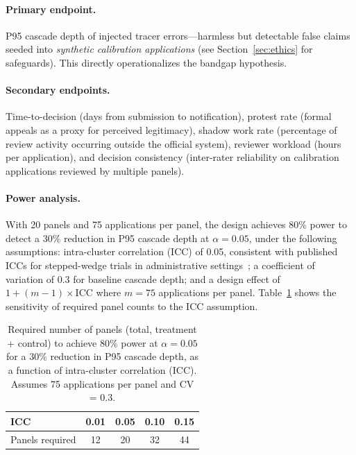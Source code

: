 \documentclass[runningheads]{llncs}
\begin{document}
\paragraph{Primary endpoint.}
P95 cascade depth of injected tracer errors---harmless but detectable false claims seeded into \emph{synthetic calibration applications} (see Section~\ref{sec:ethics} for safeguards). This directly operationalizes the bandgap hypothesis.

\paragraph{Secondary endpoints.}
Time-to-decision (days from submission to notification), protest rate (formal appeals as a proxy for perceived legitimacy), shadow work rate (percentage of review activity occurring outside the official system), reviewer workload (hours per application), and decision consistency (inter-rater reliability on calibration applications reviewed by multiple panels).

\paragraph{Power analysis.}
With 20 panels and 75 applications per panel, the design achieves 80\% power to detect a 30\% reduction in P95 cascade depth at $\alpha = 0.05$, under the following assumptions: intra-cluster correlation (ICC) of 0.05, consistent with published ICCs for stepped-wedge trials in administrative settings~\cite{hemming2015stepped}; a coefficient of variation of 0.3 for baseline cascade depth; and a design effect of $1 + (m-1) \times \mathrm{ICC}$ where $m = 75$ applications per panel. Table~\ref{tab:icc} shows the sensitivity of required panel counts to the ICC assumption.

\begin{table}[t]
\centering
\caption{Required number of panels (total, treatment + control) to achieve 80\% power at $\alpha = 0.05$ for a 30\% reduction in P95 cascade depth, as a function of intra-cluster correlation (ICC). Assumes 75 applications per panel and CV = 0.3.}
\label{tab:icc}
\begin{tabular}{@{}lcccc@{}}
\toprule
ICC & 0.01 & 0.05 & 0.10 & 0.15 \\
\midrule
Panels required & 12 & 20 & 32 & 44 \\
\bottomrule
\end{tabular}
\end{table}
\end{document}
